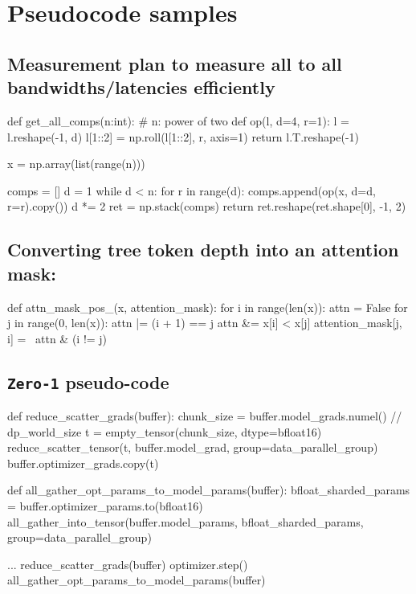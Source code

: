 \documentclass{article}
\begin{document}
\section{Pseudocode samples}

\subsection{Measurement plan to measure all to all bandwidths/latencies efficiently}
\label{all_to_all_code}
\begin{python}
def get_all_comps(n:int):
    # n: power of two
    def op(l, d=4, r=1):
        l = l.reshape(-1, d)
        l[1::2] = np.roll(l[1::2], r, axis=1)
        return l.T.reshape(-1)

    x = np.array(list(range(n)))

    comps = []
    d = 1
    while d < n:
        for r in range(d):
            comps.append(op(x, d=d, r=r).copy())
        d *= 2
    ret = np.stack(comps)
    return ret.reshape(ret.shape[0], -1, 2)
\end{python}

\subsection{Converting tree token depth into an attention mask:}
\label{sec:attn_mask_code}
\begin{python}
    def attn_mask_pos_(x, attention_mask):
    for i in range(len(x)):
        attn = False
        for j in range(0, len(x)):
            attn |= (i + 1) == j
            attn &= x[i] < x[j]
            attention_mask[j, i] = ~attn & (i != j)
\end{python}


\subsection{\texttt{Zero-1} pseudo-code}
\label{zero_pseudocode}
\begin{python}
def reduce_scatter_grads(buffer):
    chunk_size = buffer.model_grads.numel() // dp_world_size
    t = empty_tensor(chunk_size, dtype=bfloat16)
    reduce_scatter_tensor(t, buffer.model_grad, group=data_parallel_group)
    buffer.optimizer_grads.copy(t)


def all_gather_opt_params_to_model_params(buffer):
    bfloat_sharded_params = buffer.optimizer_params.to(bfloat16)
    all_gather_into_tensor(buffer.model_params, bfloat_sharded_params, group=data_parallel_group)

...
reduce_scatter_grads(buffer)
optimizer.step()
all_gather_opt_params_to_model_params(buffer)
\end{python}
\end{document}
